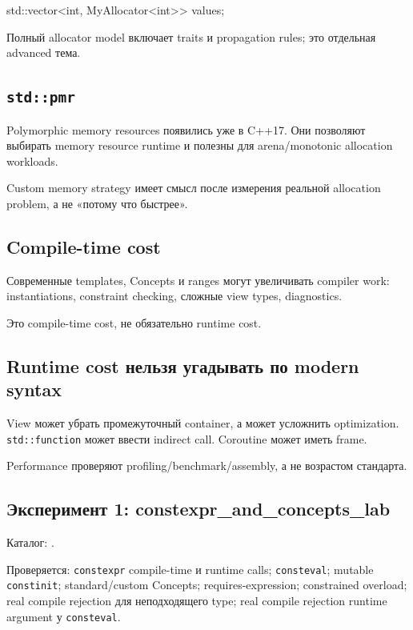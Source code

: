\begin{cppcode}
std::vector<int, MyAllocator<int>> values;
\end{cppcode}

Полный allocator model включает traits и propagation rules; это отдельная advanced тема.

\subsection{\texttt{std::pmr}}

Polymorphic memory resources появились уже в C++17. Они позволяют выбирать
memory resource runtime и полезны для arena/monotonic allocation workloads.

Custom memory strategy имеет смысл после измерения реальной allocation problem,
а не «потому что быстрее».

\subsection{Compile-time cost}

Современные templates, Concepts и ranges могут увеличивать compiler work:
instantiations, constraint checking, сложные view types, diagnostics.

Это compile-time cost, не обязательно runtime cost.

\subsection{Runtime cost нельзя угадывать по modern syntax}

View может убрать промежуточный container, а может усложнить optimization.
\texttt{std::function} может ввести indirect call. Coroutine может иметь frame.

Performance проверяют profiling/benchmark/assembly, а не возрастом стандарта.

\subsection{Эксперимент 1: constexpr\_and\_concepts\_lab}

Каталог:
.

Проверяется:
\texttt{constexpr} compile-time и runtime calls; \texttt{consteval}; mutable \texttt{constinit}; standard/custom Concepts; requires-expression; constrained overload; real compile rejection для неподходящего type; real compile rejection runtime argument у \texttt{consteval}.

